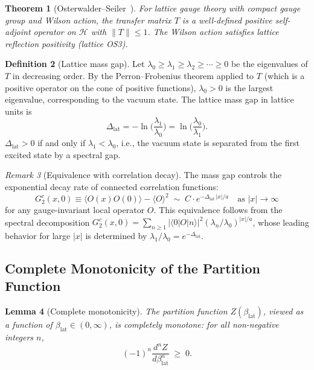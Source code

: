 \documentclass[12pt,a4paper]{article}
\theoremstyle{plain}
\newtheorem{theorem}{Theorem}[section]
\newtheorem{lemma}[theorem]{Lemma}
\theoremstyle{definition}
\newtheorem{definition}[theorem]{Definition}
\theoremstyle{remark}
\newtheorem{remark}[theorem]{Remark}
\begin{document}
\begin{theorem}[Osterwalder--Seiler~\cite{OsterwalderSeiler1978}]\label{thm:OS}
For lattice gauge theory with compact gauge group and Wilson action, the transfer matrix $T$ is a well-defined positive self-adjoint operator on $\mathcal{H}$ with $\|T\|\leq 1$. The Wilson action satisfies lattice reflection positivity (lattice OS3).
\end{theorem}

\begin{definition}[Lattice mass gap]\label{def:gap}
Let $\lambda_0\geq\lambda_1\geq\lambda_2\geq\cdots\geq 0$ be the eigenvalues of $T$ in decreasing order. By the Perron--Frobenius theorem applied to $T$ (which is a positive operator on the cone of positive functions), $\lambda_0>0$ is the largest eigenvalue, corresponding to the vacuum state. The lattice mass gap in lattice units is
\begin{equation}\label{eq:gapdef}
\Delta_{\mathrm{lat}} = -\ln\!\Big(\frac{\lambda_1}{\lambda_0}\Big) = \ln\!\Big(\frac{\lambda_0}{\lambda_1}\Big).
\end{equation}
$\Delta_{\mathrm{lat}}>0$ if and only if $\lambda_1<\lambda_0$, i.e., the vacuum state is separated from the first excited state by a spectral gap.
\end{definition}

\begin{remark}[Equivalence with correlation decay]
The mass gap controls the exponential decay rate of connected correlation functions:
\begin{equation}\label{eq:expdecay}
G_2^c(x,0) \equiv \langle O(x)O(0)\rangle - \langle O\rangle^2 \;\sim\; C\cdot e^{-\Delta_{\mathrm{lat}}\,|x|/a} \quad\text{as }|x|\to\infty
\end{equation}
for any gauge-invariant local operator $O$. This equivalence follows from the spectral decomposition $G_2^c(x,0)=\sum_{n\geq 1}|\langle 0|O|n\rangle|^2(\lambda_n/\lambda_0)^{|x|/a}$, whose leading behavior for large $|x|$ is determined by $\lambda_1/\lambda_0=e^{-\Delta_{\mathrm{lat}}}$.
\end{remark}

\subsection{Complete Monotonicity of the Partition Function}\label{sec:cm}

\begin{lemma}[Complete monotonicity]\label{lem:cm}
The partition function $Z(\beta_{\mathrm{lat}})$, viewed as a function of $\beta_{\mathrm{lat}}\in(0,\infty)$, is completely monotone: for all non-negative integers $n$,
\begin{equation}\label{eq:cm}
(-1)^n\frac{d^n Z}{d\beta_{\mathrm{lat}}^n} \;\geq\; 0.
\end{equation}
\end{lemma}
\end{document}
